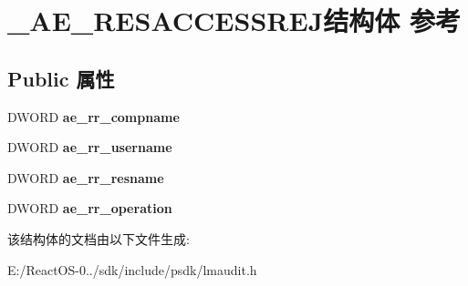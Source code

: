 \hypertarget{struct___a_e___r_e_s_a_c_c_e_s_s_r_e_j}{}\section{\+\_\+\+A\+E\+\_\+\+R\+E\+S\+A\+C\+C\+E\+S\+S\+R\+E\+J结构体 参考}
\label{struct___a_e___r_e_s_a_c_c_e_s_s_r_e_j}
\subsection*{Public 属性}
\begin{DoxyCompactItemize}
\item 
\mbox{\label{struct___a_e___r_e_s_a_c_c_e_s_s_r_e_j_a838799d31e0aba2bf167c90ea022f1f3}} 
D\+W\+O\+RD {\bfseries ae\+\_\+rr\+\_\+compname}
\item 
\mbox{\label{struct___a_e___r_e_s_a_c_c_e_s_s_r_e_j_aff829081b144b3b748487572be3e318a}} 
D\+W\+O\+RD {\bfseries ae\+\_\+rr\+\_\+username}
\item 
\mbox{\label{struct___a_e___r_e_s_a_c_c_e_s_s_r_e_j_a4eb0f5a9054b34ab343467f7d85e277c}} 
D\+W\+O\+RD {\bfseries ae\+\_\+rr\+\_\+resname}
\item 
\mbox{\label{struct___a_e___r_e_s_a_c_c_e_s_s_r_e_j_a28ae822d9326bf89c685c8fe76ebd40c}} 
D\+W\+O\+RD {\bfseries ae\+\_\+rr\+\_\+operation}
\end{DoxyCompactItemize}


该结构体的文档由以下文件生成\+:\begin{DoxyCompactItemize}
\item 
E\+:/\+React\+O\+S-\/0../sdk/include/psdk/lmaudit.\+h\end{DoxyCompactItemize}
